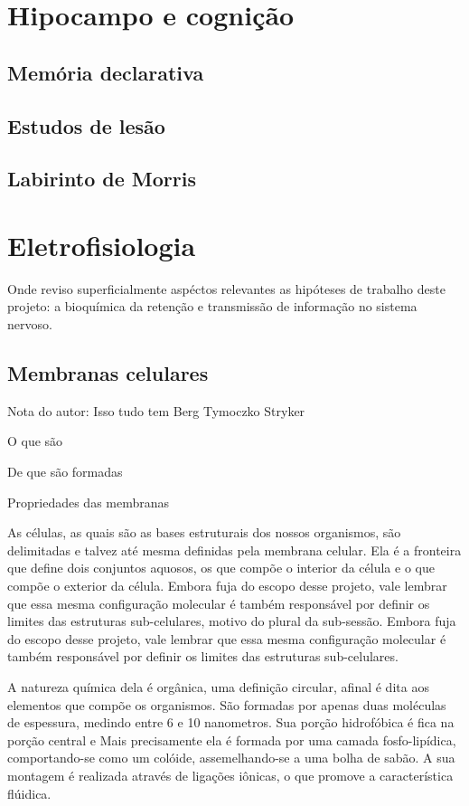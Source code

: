 \section{Hipocampo e cognição}

\subsection{Memória declarativa}

\subsection{Estudos de lesão}

\subsection{Labirinto de Morris}


\section{Eletrofisiologia}
Onde reviso superficialmente aspéctos relevantes as hipóteses de trabalho deste projeto: a bioquímica da retenção e transmissão de informação no sistema nervoso. 

\subsection{Membranas celulares}
Nota do autor: Isso tudo tem Berg Tymoczko Stryker

O que são

De que são formadas

Propriedades das membranas

As células, as quais são as bases estruturais dos nossos organismos, são delimitadas e talvez até mesma definidas pela membrana celular.
Ela é a fronteira que define dois conjuntos aquosos, os que compõe o interior da célula e o que compõe o exterior da célula.
Embora fuja do escopo desse projeto, vale lembrar que essa mesma configuração molecular é também responsável por definir os limites das estruturas sub-celulares, motivo do plural da sub-sessão.
Embora fuja do escopo desse projeto, vale lembrar que essa mesma configuração molecular é também responsável por definir os limites das estruturas sub-celulares.

A natureza química dela é orgânica, uma definição circular, afinal é dita aos elementos que compõe os organismos.
São formadas por apenas duas moléculas de espessura, medindo entre 6 e 10 nanometros. 
Sua porção hidrofóbica é fica na porção central e 
Mais precisamente ela é formada por uma camada fosfo-lipídica, comportando-se como um colóide, assemelhando-se a uma bolha de sabão.
A sua montagem é realizada através de ligações iônicas, o que promove a característica flúidica.


